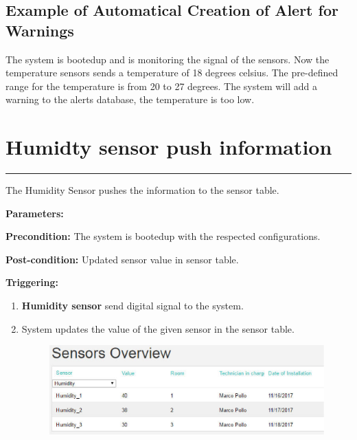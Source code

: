 \subsection{Example of Automatical Creation of Alert for Warnings}
The system is bootedup and is monitoring the signal of the sensors.
Now the temperature sensors sends a temperature of 18 degrees celsius. The
pre-defined range for the temperature is from 20 to 27 degrees. The system will
add a warning to the alerts database, the temperature is too low.






\break



\section{Humidty sensor push information}

\hrule
\hfill
\vspace{0.5cm}
\label{operation:Humidty sensor push information}

The Humidity Sensor pushes the information to the sensor table.
\begin{description}
\item \textbf{Parameters:} 
\item \textbf{Precondition:} The system is bootedup with the respected
configurations.
\item \textbf{Post-condition:} Updated sensor value in sensor table.

\item \textbf{Triggering:}
\begin{enumerate}
\item \textbf{Humidity sensor} send digital signal to the system.
\item System updates the value of the given sensor in the sensor table.
\begin{figure}[H]
\includegraphics[width=1\textwidth]{images/HumiditySensor.eps}
\end{figure}
\end{enumerate}
\end{description}

